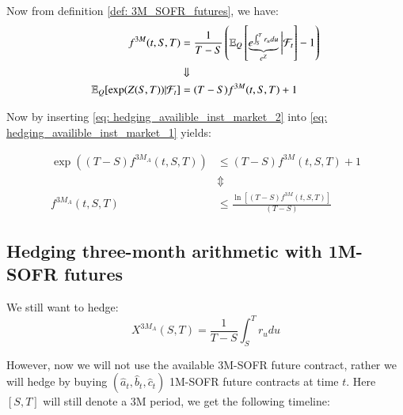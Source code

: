 Now from definition \ref{def: 3M_SOFR_futures}, we have: 
\begin{align}
\label{eq: hedging_availible_inst_market_2}
f^{3M}(t,S,T) &= \frac{1}{T-S}\left(
\mathbb{E}_{Q}\left[
\underbrace{e^{\int_{S}^{T}r_{u}du}}_{e^{Z}}
\bigg{|}\mathcal{F}_{t}\right] - 1
\right) \nonumber \\ 
&\Downarrow \nonumber \\ 
\mathbb{E}_{Q}[\exp(Z(S,T))|\mathcal{F}_{t}] &= (T-S)f^{3M}(t,S,T) + 1
\end{align}

Now by inserting \ref{eq: hedging_availible_inst_market_2} into \ref{eq: hedging_availible_inst_market_1} yields:

\begin{align*}
\exp\left(
(T-S)f^{3M_{A}}(t,S,T)
\right) 
&\leq 
(T-S)f^{3M}(t,S,T) + 1 \\ 
&\Updownarrow \\
f^{3M_{A}}(t,S,T) &\leq 
\frac{
\ln[(T-S)f^{3M}(t,S,T)]
}{
(T-S)
}
\end{align*}

\newpage 

\subsection{Hedging three-month arithmetic with 1M-SOFR futures}
\label{sec: 3M_A_vs_(a,b,c)_1M_SOFR}
We still want to hedge: 
$$
X^{3M_{A}}(S,T) = \frac{1}{T-S}\int_{S}^{T}r_{u}du
$$

However, now we will not use the available 3M-SOFR future contract, rather we will hedge by buying $(\hat{a}_{t}, \hat{b}_{t}, \hat{c}_{t})$ 1M-SOFR future contracts at time $t$. Here $[S,T]$ will still denote a 3M period, we get the following timeline:



